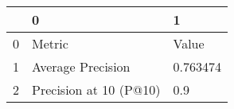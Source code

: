 \begin{tabular}{lll}
\toprule
{} &                       0 &         1 \\
\midrule
0 &                  Metric &     Value \\
1 &       Average Precision &  0.763474 \\
2 &  Precision at 10 (P@10) &       0.9 \\
\bottomrule
\end{tabular}
